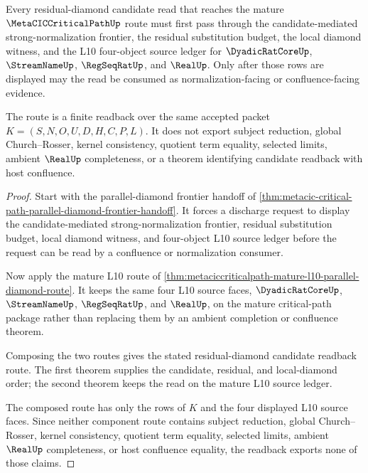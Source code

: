 \begin{theorem}
\label{thm:metaciccriticalpath-residual-diamond-candidate-readback-route}
Every residual-diamond candidate read that reaches the mature $\MetaCICCriticalPathUp$ route must first pass through the candidate-mediated strong-normalization frontier, the residual substitution budget, the local diamond witness, and the L10 four-object source ledger for $\DyadicRatCoreUp$, $\StreamNameUp$, $\RegSeqRatUp$, and $\RealUp$. Only after those rows are displayed may the read be consumed as normalization-facing or confluence-facing evidence.

The route is a finite readback over the same accepted packet $K=(S,N,O,U,D,H,C,P,L)$. It does not export subject reduction, global Church--Rosser, kernel consistency, quotient term equality, selected limits, ambient $\RealUp$ completeness, or a theorem identifying candidate readback with host confluence.
\end{theorem}
\begin{proof}
Start with the parallel-diamond frontier handoff of \autoref{thm:metacic-critical-path-parallel-diamond-frontier-handoff}. It forces a discharge request to display the candidate-mediated strong-normalization frontier, residual substitution budget, local diamond witness, and four-object L10 source ledger before the request can be read by a confluence or normalization consumer.

Now apply the mature L10 route of \autoref{thm:metaciccriticalpath-mature-l10-parallel-diamond-route}. It keeps the same four L10 source faces, $\DyadicRatCoreUp$, $\StreamNameUp$, $\RegSeqRatUp$, and $\RealUp$, on the mature critical-path package rather than replacing them by an ambient completion or confluence theorem.

Composing the two routes gives the stated residual-diamond candidate readback route. The first theorem supplies the candidate, residual, and local-diamond order; the second theorem keeps the read on the mature L10 source ledger.

The composed route has only the rows of $K$ and the four displayed L10 source faces. Since neither component route contains subject reduction, global Church--Rosser, kernel consistency, quotient term equality, selected limits, ambient $\RealUp$ completeness, or host confluence equality, the readback exports none of those claims.
\end{proof}

